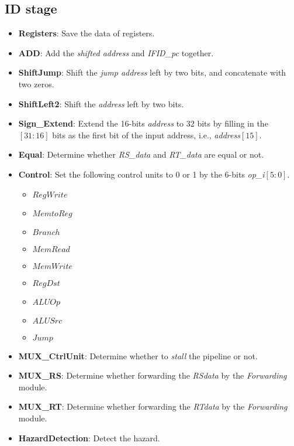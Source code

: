 \documentclass{article}
\begin{document}
    \subsection*{ID stage}
    \begin{itemize}
        \item \textbf{Registers}: Save the data of registers.
        \item \textbf{ADD}: Add the \textit{shifted address} and \textit{IFID\_pc} together.
        \item \textbf{ShiftJump}: Shift the \textit{jump address} left by two bits, and concatenate with two zeros.
        \item \textbf{ShiftLeft2}: Shift the \textit{address} left by two bits.
        \item \textbf{Sign\_Extend}: Extend the 16-bits \textit{address} to 32 bits by filling in the $[31:16]$ bits as the first bit of the input address, i.e., \textit{address$[15]$}.
        \item \textbf{Equal}: Determine whether \textit{RS\_data} and \textit{RT\_data} are equal or not.
        \item \textbf{Control}: Set the following control units to 0 or 1 by the 6-bits \textit{op\_i$[5:0]$}. 
        \begin{itemize}
            \item $RegWrite$
            \item $MemtoReg$
            \item $Branch$
            \item $MemRead$
            \item $MemWrite$
            \item $RegDst$
            \item $ALUOp$
            \item $ALUSrc$
            \item $Jump$
        \end{itemize}
        \item \textbf{MUX\_CtrlUnit}: Determine whether to \textit{stall} the pipeline or not.        
        \item \textbf{MUX\_RS}: Determine whether forwarding the \textit{RSdata} by the \textit{Forwarding} module.
        \item \textbf{MUX\_RT}: Determine whether forwarding the \textit{RTdata} by the \textit{Forwarding} module.
        \item \textbf{HazardDetection}: Detect the hazard. 
        \begin{itemize}

\end{itemize}
\end{itemize}
\end{document}
